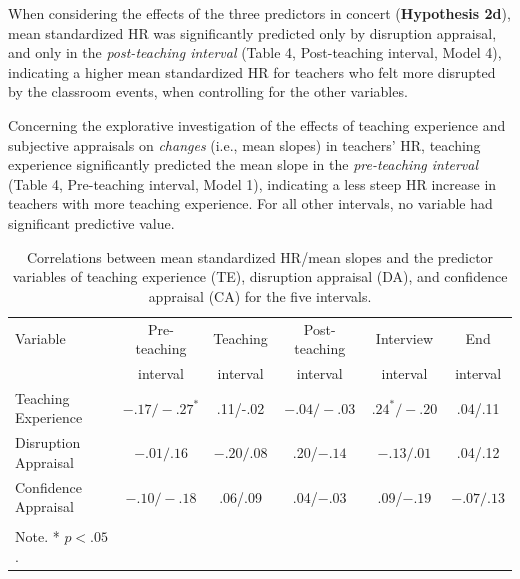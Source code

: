 \documentclass[preprint, 3p,
sort,]{elsarticle} %
\begin{document}
When considering the effects of the three predictors in concert
(\textbf{Hypothesis 2d}), mean standardized HR was significantly
predicted only by disruption appraisal, and only in the
\emph{post-teaching interval} (Table 4, Post-teaching interval, Model
4), indicating a higher mean standardized HR for teachers who felt more
disrupted by the classroom events, when controlling for the other
variables.

Concerning the explorative investigation of the effects of teaching
experience and subjective appraisals on \emph{changes} (i.e., mean
slopes) in teachers' HR, teaching experience significantly predicted the
mean slope in the \emph{pre-teaching interval} (Table 4, Pre-teaching
interval, Model 1), indicating a less steep HR increase in teachers with
more teaching experience. For all other intervals, no variable had
significant predictive value.

\renewcommand{\arraystretch}{1.5}

\begin{table}[ht]
    \centering
    \begin{tabularx}{\textwidth}{lccccc}
        \toprule
        Variable & Pre-teaching & Teaching & Post-teaching & Interview & End \\
        & interval & interval & interval & interval & interval \\
        \midrule
        Teaching Experience & $- .17/ - .27^*$ & .11/-.02 & $- .04/-.03$ & $.24^*/-.20$ & .04/.11 \\
        Disruption Appraisal & $- .01/.16$ & $- .20/.08$ & .20/$- .14$ & $- .13/.01$ & .04/.12 \\
        Confidence Appraisal & $- .10/ - .18$ & .06/.09 & .04/$- .03$ & .09/$- .19$ & $- .07/.13$ \\
        \bottomrule \\
          Note. * $p < .05$.
    \end{tabularx}
    \caption{Correlations between mean standardized HR/mean slopes and the predictor variables of teaching experience (TE), disruption appraisal (DA), and confidence appraisal (CA) for the five intervals.}
    \label{tab_3}
\end{table}
\end{document}

